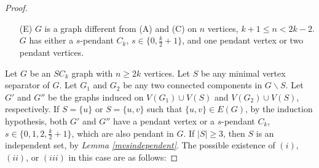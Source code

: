 \documentclass[runningheads]{llncs}
\begin{document}
\begin{proof}
\begin{itemize}
\item[(E)] $G$ is a graph different from (A) and (C) on $n$ vertices, $k+1 \leq n < 2k-2$. $G$ has either a $s$-pendant $C_k$, $s\in \{0,\frac{k}{2}+1\}$, and one pendant vertex or two pendant vertices.
\end{itemize}
\noindent Let $G$ be an $SC_k$ graph with $n \geq 2k$ vertices. Let $S$ be any minimal vertex separator of $G$. Let $G_1$ and $G_2$ be any two connected components in $G \backslash S$. Let $G'$ and $G''$ be the graphs induced on $V(G_1)\cup V(S)$ and  $V(G_2)\cup V(S)$, respectively. If  $ S  = \{u\}$ or $ S  = \{u,v\}$ such that $\{u,v\} \in E(G)$, by the induction hypothesis, both $G'$ and $G''$ have a pendant vertex or a $s$-pendant $C_k$, $s\in\{0,1,2,\frac{k}{2}+1\}$, which are also pendant in $G$. If $\mid S \mid \geq 3$, then $S$ is an independent set, by \emph{Lemma \ref{mvsindependent}}. The possible existence of $(i)$, $(ii)$, or $(iii)$ in this case are as follows:


\end{proof}
\end{document}
